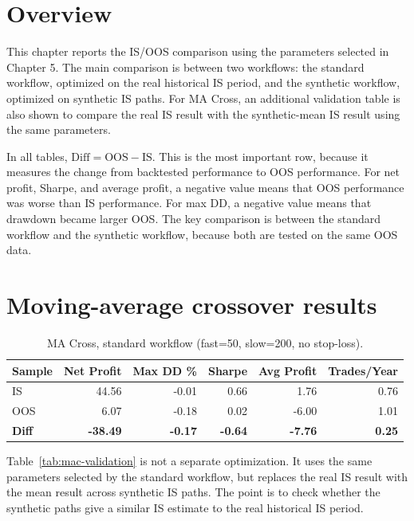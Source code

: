 \section{Overview}

This chapter reports the IS/OOS comparison using the parameters selected in Chapter 5. The main
comparison is between two workflows: the standard workflow, optimized on the real historical IS period,
and the synthetic workflow, optimized on synthetic IS paths. For MA Cross, an additional validation
table is also shown to compare the real IS result with the synthetic-mean IS result using the same
parameters.

In all tables, \(\text{Diff} = \text{OOS} - \text{IS}\). This is the most important row, because it measures the change from
backtested performance to OOS performance. For net profit, Sharpe, and average profit, a negative value
means that OOS performance was worse than IS performance. For max DD, a negative value means that
drawdown became larger OOS. The key comparison is between the standard workflow and the synthetic
workflow, because both are tested on the same OOS data.

\section{Moving-average crossover results}

\begin{table}[H]
    \centering
    \begin{tabular}{lrrrrr}
        \toprule
        Sample & Net Profit & Max DD \% & Sharpe & Avg Profit & Trades/Year \\
        \midrule
        IS   & 44.56  & -0.01 & 0.66  & 1.76  & 0.76 \\
        OOS  & 6.07   & -0.18 & 0.02  & -6.00 & 1.01 \\
        \textbf{Diff} & \textbf{-38.49} & \textbf{-0.17} & \textbf{-0.64} & \textbf{-7.76} & \textbf{0.25} \\
        \bottomrule
    \end{tabular}
    \caption{MA Cross, standard workflow (fast=50, slow=200, no stop-loss).}
    \label{tab:mac-standard}
\end{table}

Table~\ref{tab:mac-validation} is not a separate optimization. It uses the same parameters selected by
the standard workflow, but replaces the real IS result with the mean result across synthetic IS paths.
The point is to check whether the synthetic paths give a similar IS estimate to the real historical IS
period.

